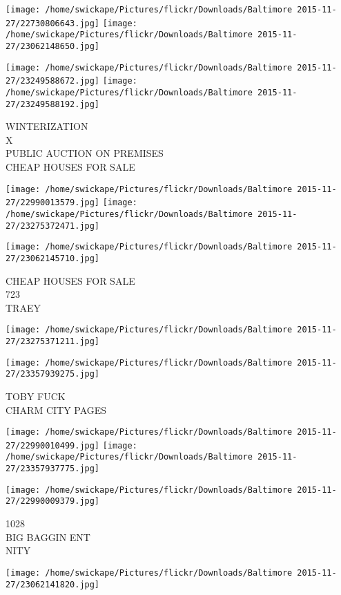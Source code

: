 \documentclass[10pt,letterpaper]{article}
\begin{document}
\texttt{[image: /home/swickape/Pictures/flickr/Downloads/Baltimore 2015-11-27/22730806643.jpg]}
\texttt{[image: /home/swickape/Pictures/flickr/Downloads/Baltimore 2015-11-27/23062148650.jpg]}

\texttt{[image: /home/swickape/Pictures/flickr/Downloads/Baltimore 2015-11-27/23249588672.jpg]}
\texttt{[image: /home/swickape/Pictures/flickr/Downloads/Baltimore 2015-11-27/23249588192.jpg]}

WINTERIZATION\\
X\\
PUBLIC AUCTION ON PREMISES\\
CHEAP HOUSES FOR SALE
\pagebreak

\texttt{[image: /home/swickape/Pictures/flickr/Downloads/Baltimore 2015-11-27/22990013579.jpg]}
\texttt{[image: /home/swickape/Pictures/flickr/Downloads/Baltimore 2015-11-27/23275372471.jpg]}

\vspace{0.25in}
\texttt{[image: /home/swickape/Pictures/flickr/Downloads/Baltimore 2015-11-27/23062145710.jpg]}

CHEAP HOUSES FOR SALE\\
723\\
TRAEY
\pagebreak

\texttt{[image: /home/swickape/Pictures/flickr/Downloads/Baltimore 2015-11-27/23275371211.jpg]}

\vspace{0.25in}
\texttt{[image: /home/swickape/Pictures/flickr/Downloads/Baltimore 2015-11-27/23357939275.jpg]}

TOBY FUCK\\
CHARM CITY PAGES
\pagebreak

\texttt{[image: /home/swickape/Pictures/flickr/Downloads/Baltimore 2015-11-27/22990010499.jpg]}
\texttt{[image: /home/swickape/Pictures/flickr/Downloads/Baltimore 2015-11-27/23357937775.jpg]}

\vspace{0.25in}
\texttt{[image: /home/swickape/Pictures/flickr/Downloads/Baltimore 2015-11-27/22990009379.jpg]}

1028\\
BIG BAGGIN ENT\\
NITY
\pagebreak

\texttt{[image: /home/swickape/Pictures/flickr/Downloads/Baltimore 2015-11-27/23062141820.jpg]}
\end{document}
